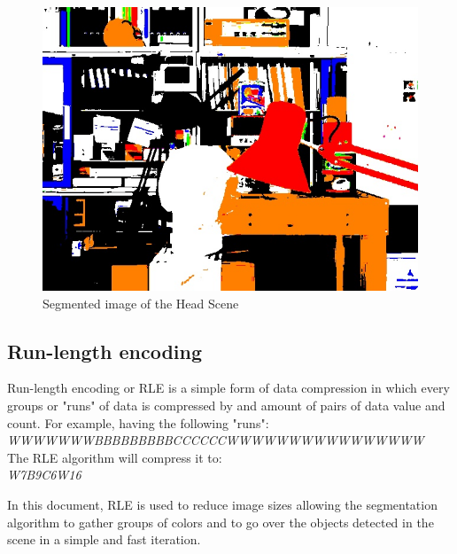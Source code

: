 \begin{figure}[htp]
	\centering
	\includegraphics[width=0.4\linewidth]{../Images/c2/head_scene_tsukuba_seg}
	\caption{Segmented image of the Head Scene}
	\label{fig:head_scene_tsukuba_seg}
\end{figure}






\subsection{Run-length encoding}
Run-length encoding or RLE is a simple form of data compression in which every groups or "runs" of data is compressed by and amount of pairs of data value and count. For example, having the following "runs": \\

\textit{WWWWWWWBBBBBBBBBCCCCCCWWWWWWWWWWWWWWWW} \\

The RLE algorithm will compress it to: \\
\textit{W7B9C6W16}

In this document, RLE is used to reduce image sizes allowing the segmentation algorithm to gather groups of colors and to go over the objects detected in the scene in a simple and fast iteration. \\


